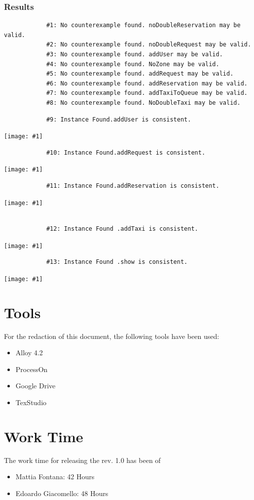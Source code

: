 \documentclass[11pt, a4paper,titlepage]{article}
\newcommand{\image}[1]{
	\begin{center}
		\noindent \texttt{[image: \#1]}
	\end{center}
	}
\begin{document}
		\subsubsection{Results}
		
		\begin{verbatim}
			#1: No counterexample found. noDoubleReservation may be valid.
			#2: No counterexample found. noDoubleRequest may be valid.
			#3: No counterexample found. addUser may be valid.
			#4: No counterexample found. NoZone may be valid.
			#5: No counterexample found. addRequest may be valid.
			#6: No counterexample found. addReservation may be valid.
			#7: No counterexample found. addTaxiToQueue may be valid.
			#8: No counterexample found. NoDoubleTaxi may be valid.
		\end{verbatim}
		
		\begin{verbatim}
			#9: Instance Found.addUser is consistent.
		\end{verbatim}
		\image{diagram_alloy1.png}
		\begin{verbatim}
			#10: Instance Found.addRequest is consistent.
		\end{verbatim}
		\image{diagram_alloy2.png}
		\begin{verbatim}
			#11: Instance Found.addReservation is consistent.
		\end{verbatim}
		\image{diagram_alloy3.png}
		\begin{verbatim}
		
			#12: Instance Found .addTaxi is consistent.
		\end{verbatim}
		\image{diagram_alloy4.png}
		\begin{verbatim}
			#13: Instance Found .show is consistent.
		\end{verbatim}
		\image{diagram_alloy5.png}
		
		\section{Tools}
			For the redaction of this document, the following tools have been used:
			\begin{itemize}
				\item Alloy 4.2
				\item ProcessOn
				\item Google Drive
				\item TexStudio
			\end{itemize}
		\section{Work Time}
			The work time for releasing the rev. 1.0 has been of 
				\begin{itemize}
					\item Mattia Fontana: 42 Hours
					\item Edoardo Giacomello: 48 Hours
				\end{itemize}
				
\end{document}
